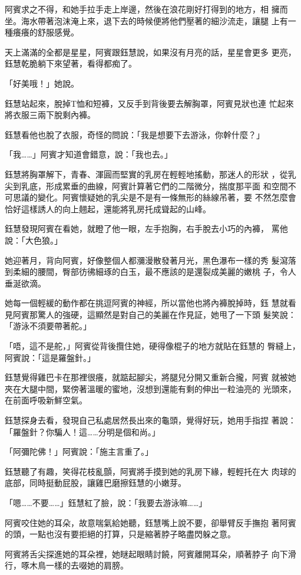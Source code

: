 阿賓求之不得，和她手拉手走上岸邊，然後在浪花剛好打得到的地方，相
擁而坐。海水帶著泡沫淹上來，退下去的時候便將他們壓著的細沙流走，讓腿
上有一種癢癢的舒服感覺。

天上滿滿的全都是星星，阿賓跟鈺慧說，如果沒有月亮的話，星星會更多
更亮，鈺慧乾脆躺下來望著，看得都痴了。

「好美哦！」她說。

鈺慧站起來，脫掉T恤和短褲，又反手到背後要去解胸罩，阿賓見狀也連
忙起來將衣服三兩下脫剩內褲。

鈺慧看他也脫了衣服，奇怪的問說：「我是想要下去游泳，你幹什麼？」

「我……」阿賓才知道會錯意，說：「我也去。」

鈺慧將胸罩解下，青春、渾圓而堅實的乳房在輕輕地搖動，那迷人的形狀
，從乳尖到乳底，形成累垂的曲線，阿賓計算著它們的二階微分，揣度那平面
和空間不可思議的變化。阿賓懷疑她的乳尖是不是有一條無形的絲線吊著，要
不然怎麼會恰好這樣誘人的向上翹起，還能將乳房托成聳起的山峰。

鈺慧發現阿賓在看她，就瞪了他一眼，左手抱胸，右手脫去小巧的內褲，
罵他說：「大色狼。」

她迎著月，背向阿賓，好像整個人都瀰漫散發著月光，黑色瀑布一樣的秀
髮瀉落到柔細的腰間，臀部彷彿細琢的白玉，最不應該的是還裂成美麗的嫩桃
子，令人垂涎欲滴。

她每一個輕緩的動作都在挑逗阿賓的神經，所以當他也將內褲脫掉時，鈺
慧就看見阿賓那驚人的強硬，這顯然是對自己的美麗在作見証，她甩了一下頭
髮笑說：「游泳不須要帶著舵。」

「唔，這不是舵，」阿賓從背後攬住她，硬得像棍子的地方就貼在鈺慧的
臀縫上，阿賓說：「這是羅盤針。」

鈺慧覺得雞巴卡在那裡很癢，就踮起腳尖，將腿兒分開又重新合攏，阿賓
就被她夾在大腿中間，緊傍著溫暖的蜜地，沒想到還能有剩的伸出一粒油亮的
光頭來，在前面呼吸新鮮空氣。

鈺慧探身去看，發現自己私處居然長出來的龜頭，覺得好玩，她用手指捏
著說：「羅盤針？你騙人！這……分明是個和尚。」

「阿彌陀佛！」阿賓說：「施主言重了。」

鈺慧聽了有趣，笑得花枝亂顫，阿賓將手摸到她的乳房下緣，輕輕托在大
肉球的底部，同時挺動屁股，讓雞巴磨擦鈺慧的小嫩芽。

「嗯……不要……」鈺慧紅了臉，說：「我要去游泳嘛……」

阿賓咬住她的耳朵，故意喘氣給她聽，鈺慧嘴上說不要，卻舉臂反手撫抱
著阿賓的頭，一點也沒有要拒絕的打算，只是縮著脖子略盡閃躲之意。

阿賓將舌尖探進她的耳朵裡，她瞇起眼睛討饒，阿賓離開耳朵，順著脖子
向下滑行，啄木鳥一樣的去啜她的肩膀。

